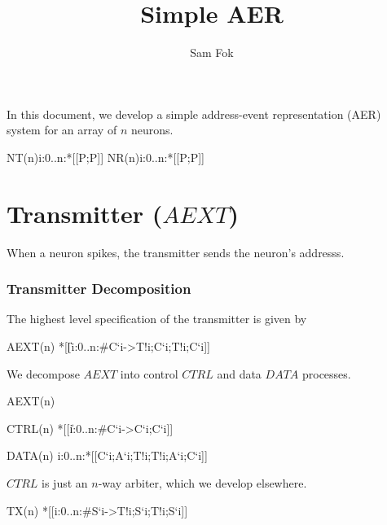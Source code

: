 \documentclass{article}
\begin{document}
\title{Simple AER}
\author{Sam Fok}
\maketitle

In this document, we develop a simple address-event representation (AER) system for an array of $n$ neurons.

\begin{csp}
NT(n)\equiv\langle\pll\!i:0..n:*[[P;P]]\rangle
NR(n)\equiv\langle\pll\!i:0..n:*[[P;P]]\rangle
\end{csp}
\part{Transmitter ($AEXT$)}

When a neuron spikes, the transmitter sends the neuron's addresss.

\section{Transmitter Decomposition}

The highest level specification of the transmitter is given by

\begin{csp}
AEXT(n)\equiv
  *[[\langle\|\!i:0..n:#{C`i}->T!i;C`i;T!i;C`i]]
\end{csp}

\noindent We decompose $AEXT$ into control $CTRL$ and data $DATA$ processes.

\begin{csp}
AEXT(n)
\end{csp}

\begin{csp}
CTRL(n)\equiv
  *[[\langle\|i:0..n:#{C`i}->C`i;C`i]]
\end{csp}

\begin{csp}
DATA(n)\equiv
  \langle\pll\!i:0..n:*[[C`i;A`i;T!i;T!i;A`i;C`i]]\rangle
\end{csp}

$CTRL$ is just an $n$-way arbiter, which we develop elsewhere.

\begin{csp}
TX(n)\equiv
  *[[\langle[]i:0..n:#{S`i}->T!i;S`i;T!i;S`i\rangle]]
\end{csp}
\end{document}
